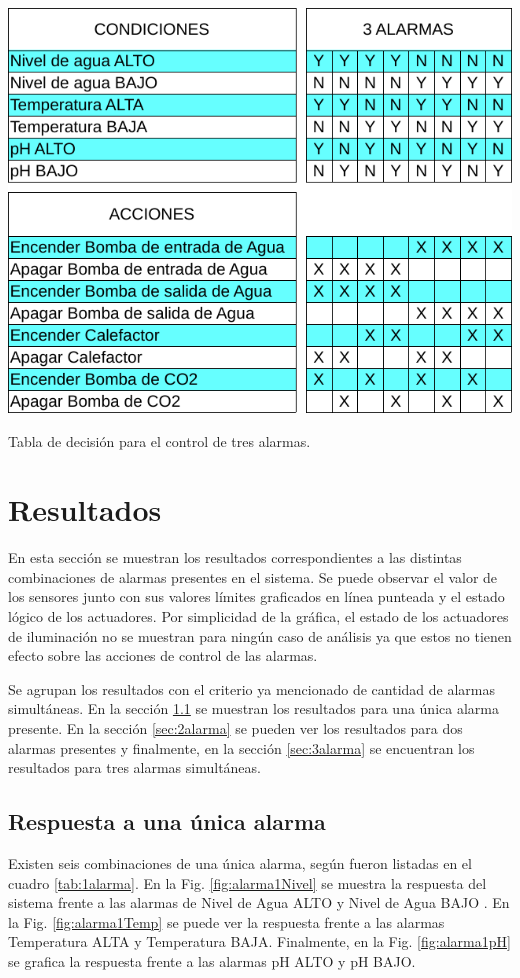 \begin{table}[p]
	\centering
    \includegraphics[width=.6\textwidth]{./Figures/tabla3alarmas.pdf}
	\caption{Tabla de decisión para el control de tres alarmas.}
	\label{tab:3alarmas}
\end{table}


\section{Resultados}
\label{sec:Resultados}

En esta sección se muestran los resultados correspondientes a las distintas combinaciones de alarmas presentes en el sistema.  Se puede observar el valor de los sensores junto con sus valores límites graficados en línea punteada y el estado lógico de los actuadores.  Por simplicidad de la gráfica, el estado de los actuadores de iluminación no se muestran para ningún caso de análisis ya que estos no tienen efecto sobre las acciones de control de las alarmas.

Se agrupan los resultados con el criterio ya mencionado de cantidad de alarmas simultáneas.  En la sección \ref{sec:1alarma} se muestran los resultados para una única alarma presente. En la sección \ref{sec:2alarma} se pueden ver los resultados para dos alarmas presentes y finalmente, en la sección \ref{sec:3alarma} se encuentran los resultados para tres alarmas simultáneas.

\subsection{Respuesta a una única alarma}
\label{sec:1alarma}
Existen seis combinaciones de una única alarma, según fueron listadas en el cuadro \ref{tab:1alarma}. En la Fig. \ref{fig:alarma1Nivel} se muestra la respuesta del sistema frente a las alarmas de Nivel de Agua ALTO y Nivel de Agua BAJO . En la Fig. \ref{fig:alarma1Temp} se puede ver la respuesta frente a las alarmas Temperatura ALTA y Temperatura BAJA. Finalmente, en la Fig. \ref{fig:alarma1pH} se grafica la respuesta frente a las alarmas pH ALTO y pH BAJO.

